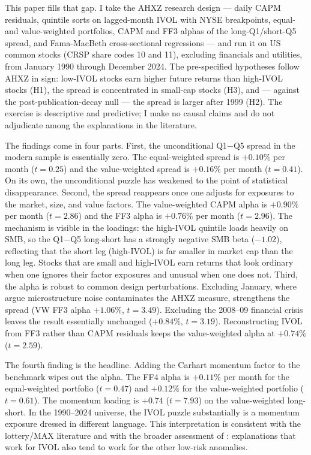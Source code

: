 \documentclass[12pt]{article}
\newcommand{\1}[1]{\mathds{1}\left[#1\right]}
\begin{document}
This paper fills that gap. I take the AHXZ research design --- daily CAPM
residuals, quintile sorts on lagged-month IVOL with NYSE breakpoints, equal-
and value-weighted portfolios, CAPM and FF3 alphas of the long-Q1/short-Q5
spread, and Fama-MacBeth cross-sectional regressions --- and run it on US
common stocks (CRSP share codes 10 and 11), excluding financials and utilities,
from January 1990 through December 2024. The pre-specified hypotheses follow
AHXZ in sign: low-IVOL stocks earn higher future returns than high-IVOL stocks
(H1), the spread is concentrated in small-cap stocks (H3), and --- against
the post-publication-decay null --- the spread is larger after 1999 (H2). The
exercise is descriptive and predictive; I make no causal claims and do not
adjudicate among the explanations in the literature.

The findings come in four parts. First, the unconditional Q1$-$Q5 spread
in the modern sample is essentially zero. The equal-weighted spread is $+0.10\%$
per month ($t=0.25$) and the value-weighted spread is $+0.16\%$ per month
($t=0.41$). On its own, the unconditional puzzle has weakened to the point of
statistical disappearance. Second, the spread reappears once one adjusts for
exposures to the market, size, and value factors. The value-weighted CAPM alpha
is $+0.90\%$ per month ($t=2.86$) and the FF3 alpha is $+0.76\%$ per month
($t=2.96$). The mechanism is visible in the loadings: the high-IVOL quintile
loads heavily on SMB, so the Q1$-$Q5 long-short has a strongly negative SMB
beta ($-1.02$), reflecting that the short leg (high-IVOL) is far smaller in
market cap than the long leg. Stocks that are small and high-IVOL earn returns
that look ordinary when one ignores their factor exposures and unusual when one
does not. Third, the alpha is robust to common design perturbations. Excluding
January, where \citet{han2011investor} argue microstructure noise contaminates
the AHXZ measure, strengthens the spread (VW FF3 alpha $+1.06\%$, $t=3.49$).
Excluding the 2008--09 financial crisis leaves the result essentially unchanged
($+0.84\%$, $t=3.19$). Reconstructing IVOL from FF3 rather than CAPM residuals
keeps the value-weighted alpha at $+0.74\%$ ($t=2.59$).

The fourth finding is the headline. Adding the Carhart momentum factor to the
benchmark wipes out the alpha. The FF4 alpha is $+0.11\%$ per month for the
equal-weighted portfolio ($t=0.47$) and $+0.12\%$ for the value-weighted
portfolio ($t=0.61$). The momentum loading is $+0.74$ ($t=7.93$) on the
value-weighted long-short. In the 1990--2024 universe, the IVOL puzzle
substantially is a momentum exposure dressed in different language. This
interpretation is consistent with the lottery/MAX literature
\citep{bali2011maxing,bali2017lottery} and with the broader assessment of
\citet{hou2016have}: explanations that work for IVOL also tend to work for the
other low-risk anomalies.
\end{document}
